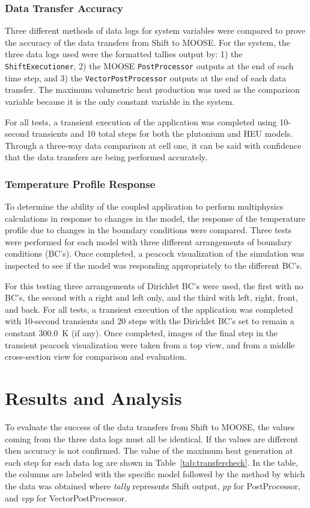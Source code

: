 \documentclass{anstrans}
\begin{document}
\subsubsection{Data Transfer Accuracy}
Three different methods of data logs for system variables were compared to prove the accuracy of the data transfers from Shift to MOOSE. For the system, the three data logs used were the formatted tallies output by: 1) the \texttt{ShiftExecutioner}, 2) the MOOSE \texttt{PostProcessor} outputs at the end of each time step, and 3) the \texttt{VectorPostProcessor} outputs at the end of each data transfer. The maximum volumetric heat production was used as the comparison variable because it is the only constant variable in the system.

For all tests, a transient execution of the application was completed using 10-second transients and 10 total steps for both the plutonium and HEU models. Through a three-way data comparison at cell one, it can be said with confidence that the data transfers are being performed accurately. 

\subsubsection{Temperature Profile Response}
To determine the ability of the coupled application to perform multiphysics calculations in response to changes in the model, the response of the temperature profile due to changes in the boundary conditions were compared. Three tests were performed for each model with three different arrangements of boundary conditions (BC's). Once completed, a peacock visualization of the simulation was inspected to see if the model was responding appropriately to the different BC's. 

For this testing three arrangements of Dirichlet BC's were used, the first with no BC's, the second with a right and left only, and the third with left, right, front, and back. For all tests, a transient execution of the application was completed with 10-second transients and 20 steps with the Dirichlet BC's set to remain a constant \SI{300.0}{\kelvin} (if any). Once completed, images of the final step in the transient peacock visualization were taken from a top view, and from a middle cross-section view for comparison and evaluation.  

\section{Results and Analysis}
To evaluate the success of the data transfers from Shift to MOOSE, the values coming from the three data logs must all be identical. If the values are different then accuracy is not confirmed. The value of the maximum heat generation at each step for each data log are shown in Table~\ref{tab:transfercheck}. In the table, the columns are labeled with the specific model followed by the method by which the data was obtained where \textsl{tally} represents Shift output, \textsl{pp} for PostProcessor, and \textsl{vpp} for VectorPostProcessor.
\end{document}
